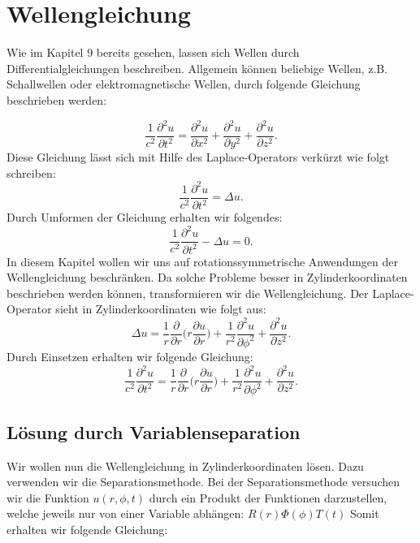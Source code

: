 \section{Wellengleichung}


Wie im Kapitel 9 bereits gesehen, lassen sich Wellen durch Differentialgleichungen beschreiben. Allgemein können beliebige Wellen, z.B. Schallwellen oder elektromagnetische Wellen, durch folgende Gleichung beschrieben werden:

\begin{equation}
\frac{1}{c^2} \frac{\partial^2 u}{\partial t^2} = \frac{\partial^2 u}{\partial x^2} + \frac{\partial^2 u}{\partial y^2} + \frac{\partial^2 u}{\partial z^2}.
\end{equation}
Diese Gleichung lässt sich mit Hilfe des Laplace-Operators verkürzt wie folgt schreiben:%
\begin{equation}
\frac{1}{c^2} \frac{\partial^2 u}{\partial t^2} = \Delta u.
\end{equation}
Durch Umformen der Gleichung erhalten wir folgendes:
\begin{equation}
\frac{1}{c^2} \frac{\partial^2 u}{\partial t^2} - \Delta u = 0.
\end{equation}
In diesem Kapitel wollen wir uns auf rotationssymmetrische Anwendungen der Wellengleichung beschränken. Da solche Probleme besser in Zylinderkoordinaten beschrieben werden können, transformieren wir die Wellengleichung. Der Laplace-Operator sieht in Zylinderkoordinaten wie folgt aus:
\begin{equation}
\Delta u = \frac{1}{r} \frac{\partial}{\partial r}\biggl(r \frac{\partial u}{\partial r}\biggr) + \frac{1}{r^2} \frac{\partial^2 u}{\partial \phi^2} + \frac{\partial^2 u}{\partial z^2}.
\end{equation} 
Durch Einsetzen erhalten wir folgende Gleichung:
\begin{equation}
\frac{1}{c^2} \frac{\partial^2 u}{\partial t^2}
=
\frac{1}{r} \frac{\partial}{\partial r}\biggl(r \frac{\partial u}{\partial r}\biggr) + \frac{1}{r^2} \frac{\partial^2 u}{\partial \phi^2} + \frac{\partial^2 u}{\partial z^2}.
\end{equation}

\subsection[Lösung durch Variablenseparation]{Lösung durch Variablenseparation}

Wir wollen nun die Wellengleichung in Zylinderkoordinaten lösen. Dazu verwenden wir die Separationsmethode.
Bei der Separationsmethode versuchen wir die Funktion $u(r, \phi, t)$ durch ein Produkt der Funktionen darzustellen, welche jeweils nur von einer Variable abhängen: $R(r)\Phi(\phi)T(t)$
Somit erhalten wir folgende Gleichung:

